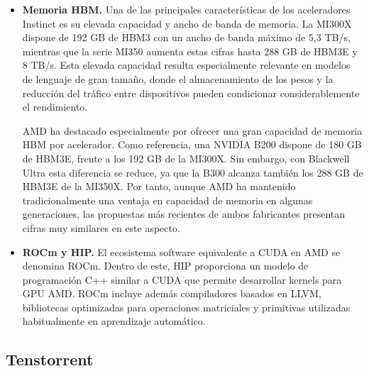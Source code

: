 \begin{itemize}
Este enfoque basado en \textit{chiplets}, utilizado también por AMD en sus procesadores Ryzen, permite ensamblar dispositivos de gran tamaño a partir de varios dados de menor superficie. Esto puede mejorar el rendimiento de fabricación, ya que un defecto localizado afecta únicamente a uno de los chiplets y no necesariamente al dispositivo completo. Como contrapartida, la comunicación entre chiplets introduce una latencia y un coste energético superiores a los de la comunicación dentro de un mismo dado, por lo que el diseño de la interconexión resulta especialmente importante para mantener un elevado rendimiento.

\item \textbf{Memoria HBM.}
Una de las principales características de los aceleradores Instinct es su elevada capacidad y ancho de banda de memoria. La MI300X dispone de 192 GB de HBM3 con un ancho de banda máximo de 5,3 TB/s, mientras que la serie MI350 aumenta estas cifras hasta 288 GB de HBM3E y 8 TB/s. Esta elevada capacidad resulta especialmente relevante en modelos de lenguaje de gran tamaño, donde el almacenamiento de los pesos y la reducción del tráfico entre dispositivos pueden condicionar considerablemente el rendimiento.

AMD ha destacado especialmente por ofrecer una gran capacidad de memoria HBM por acelerador. Como referencia, una NVIDIA B200 dispone de 180 GB de HBM3E, frente a los 192 GB de la MI300X. Sin embargo, con Blackwell Ultra esta diferencia se reduce, ya que la B300 alcanza también los 288 GB de HBM3E de la MI350X. Por tanto, aunque AMD ha mantenido tradicionalmente una ventaja en capacidad de memoria en algunas generaciones, las propuestas más recientes de ambos fabricantes presentan cifras muy similares en este aspecto.

\item \textbf{ROCm y HIP.}
El ecosistema software equivalente a CUDA en AMD se denomina ROCm. Dentro de este, HIP proporciona un modelo de programación C++ similar a CUDA que permite desarrollar kernels para GPU AMD. ROCm incluye además compiladores basados en LLVM, bibliotecas optimizadas para operaciones matriciales y primitivas utilizadas habitualmente en aprendizaje automático.

\end{itemize}

\subsection{Tenstorrent}
\label{subsec:tenstorrent}

